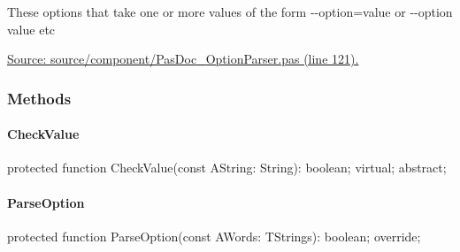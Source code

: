 \documentclass{report}
\newif\ifpdf
\begin{document}
 These options that take one or more values of the form {-}{-}option=value or {-}{-}option value etc\par
\href{https://github.com/pasdoc/pasdoc/blob/master/source/component/PasDoc_OptionParser.pas#L121}{Source: source/component/PasDoc{\_}OptionParser.pas (line 121).}\subsubsection*{\large{\textbf{Methods}}\normalsize\hspace{1ex}\hfill}
\paragraph*{CheckValue}\hspace*{\fill}

\label{PasDoc_OptionParser.TValueOption-CheckValue}
\begin{list}{}{
\setlength{\itemindent}{0cm}
\setlength{\listparindent}{0cm}
\setlength{\leftmargin}{\evensidemargin}
\addtolength{\leftmargin}{\tmplength}
\settowidth{\labelsep}{X}
\addtolength{\leftmargin}{\labelsep}
\setlength{\labelwidth}{\tmplength}
}
\item[\textbf{Declaration}\hfill]
\ifpdf
\begin{flushleft}
\fi
\begin{ttfamily}
protected function CheckValue(const AString: String): boolean; virtual; abstract;\end{ttfamily}

\ifpdf
\end{flushleft}
\fi

\end{list}
\paragraph*{ParseOption}\hspace*{\fill}

\label{PasDoc_OptionParser.TValueOption-ParseOption}
\begin{list}{}{
\setlength{\itemindent}{0cm}
\setlength{\listparindent}{0cm}
\setlength{\leftmargin}{\evensidemargin}
\addtolength{\leftmargin}{\tmplength}
\settowidth{\labelsep}{X}
\addtolength{\leftmargin}{\labelsep}
\setlength{\labelwidth}{\tmplength}
}
\item[\textbf{Declaration}\hfill]
\ifpdf
\begin{flushleft}
\fi
\begin{ttfamily}
protected function ParseOption(const AWords: TStrings): boolean; override;\end{ttfamily}

\ifpdf
\end{flushleft}
\fi

\end{list}
\ifpdf
\end{document}
